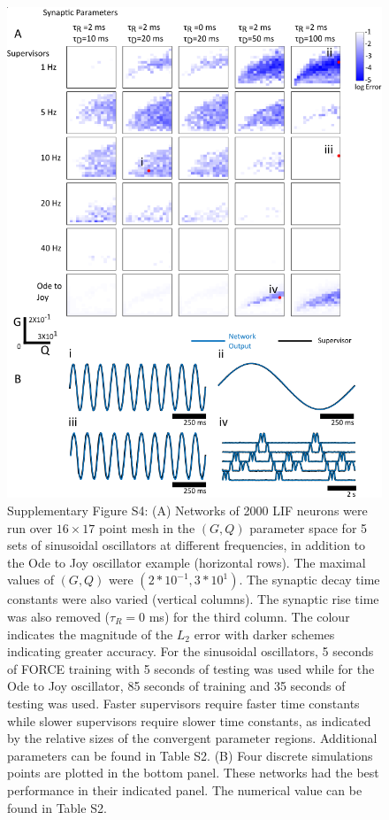 \documentclass[11pt]{article} %
\begin{document}
\clearpage

\begin{figure}[htp!]
\centering
\includegraphics[scale=0.80]{FFIGS6}
\newpage
\caption*{Supplementary Figure S4: (A)  Networks of 2000 LIF neurons were run over $16\times17$ point mesh in the $(G,Q)$ parameter space for 5 sets of sinusoidal oscillators at different frequencies, in addition to the Ode to Joy oscillator example (horizontal rows).   The maximal values of $(G,Q)$ were $(2*10^{-1},3*10^1)$.  The synaptic decay time constants were also varied (vertical columns).  The synaptic rise time was also removed ($\tau_R =0$ ms) for the third column.  The colour indicates the magnitude of the $L_2$ error with darker schemes indicating greater accuracy.  For the sinusoidal oscillators, 5 seconds of FORCE training with 5 seconds of testing was used while for the Ode to Joy oscillator, 85 seconds of training and 35 seconds of testing was used.  Faster supervisors require faster time constants while slower supervisors require slower time constants, as indicated by the relative sizes of the convergent parameter regions. Additional parameters can be found in Table S2. (B)  Four discrete simulations points are plotted in the bottom panel.  These networks had the best performance in their indicated panel. The numerical value can be found in Table S2. } 
\end{figure}
\end{document}
